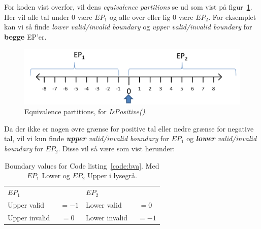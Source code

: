 For koden vist overfor, vil dens \textit{equivalence partitions} se ud som vist på figur~\ref{fig:ep}. Her vil alle tal under 0 være $EP_1$ og alle over eller lig 0 være $EP_2$. For eksemplet kan vi så finde \textit{lower valid/invalid boundary} og \textit{upper valid/invalid boundary} for \textbf{begge} EP'er.

\begin{figure}[h]
\centering
\includegraphics[width=0.8\linewidth]{figs/ep}
\caption{Equivalence partitions, for \textit{IsPositive()}.}
\label{fig:ep}
\end{figure}

Da der ikke er nogen øvre grænse for positive tal eller nedre grænse for negative tal, vil vi kun finde \textit{\textbf{upper} valid/invalid boundary} for $EP_1$ og \textit{\textbf{lower} valid/invalid boundary} for $EP_2$. Disse vil så være som vist herunder:

\begin{table}[H]
	\centering
	\begin{tabular}{lclc}
		\rowcolor{Black!25} $EP_1$ 		&				& $EP_2$ 		&			\\ %
		Upper valid						&$~~=-1$			& Lower valid	& $=0$		\\
		Upper invalid 					&$=0$			& Lower invalid	& $~~=-1$		\\ %
	\end{tabular}
	\caption{Boundary values for Code listing~\ref{code:bva}. Med $EP_1$ Lower og $EP_2$ Upper i lysegrå.}
\end{table}

















